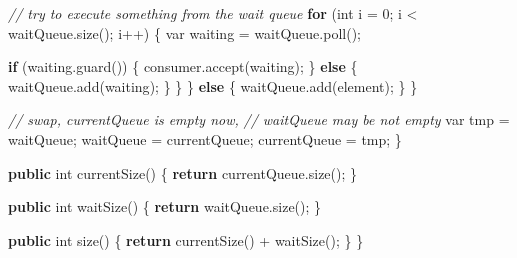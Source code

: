 \documentclass[11pt]{article}
\newenvironment{Shaded}{}{}
\newcommand{\KeywordTok}[1]{\textcolor[rgb]{0.00,0.44,0.13}{\textbf{{#1}}}}
\newcommand{\DataTypeTok}[1]{\textcolor[rgb]{0.56,0.13,0.00}{{#1}}}
\newcommand{\DecValTok}[1]{\textcolor[rgb]{0.25,0.63,0.44}{{#1}}}
\newcommand{\CommentTok}[1]{\textcolor[rgb]{0.38,0.63,0.69}{\textit{{#1}}}}
\newcommand{\FunctionTok}[1]{\textcolor[rgb]{0.02,0.16,0.49}{{#1}}}
\newcommand{\NormalTok}[1]{{#1}}
\newcommand{\ControlFlowTok}[1]{\textcolor[rgb]{0.00,0.44,0.13}{\textbf{{#1}}}}
\newcommand{\OperatorTok}[1]{\textcolor[rgb]{0.40,0.40,0.40}{{#1}}}
\begin{document}
\begin{Shaded}
\begin{Highlighting}[]
                \CommentTok{// try to execute something from the wait queue}
                \ControlFlowTok{for} \OperatorTok{(}\DataTypeTok{int}\NormalTok{ i }\OperatorTok{=} \DecValTok{0}\OperatorTok{;}\NormalTok{ i }\OperatorTok{\textless{}}\NormalTok{ waitQueue}\OperatorTok{.}\FunctionTok{size}\OperatorTok{();}\NormalTok{ i}\OperatorTok{++)} \OperatorTok{\{}
                    \DataTypeTok{var}\NormalTok{ waiting }\OperatorTok{=}\NormalTok{ waitQueue}\OperatorTok{.}\FunctionTok{poll}\OperatorTok{();}

                    \ControlFlowTok{if} \OperatorTok{(}\NormalTok{waiting}\OperatorTok{.}\FunctionTok{guard}\OperatorTok{())} \OperatorTok{\{}
\NormalTok{                        consumer}\OperatorTok{.}\FunctionTok{accept}\OperatorTok{(}\NormalTok{waiting}\OperatorTok{);}
                    \OperatorTok{\}} \ControlFlowTok{else} \OperatorTok{\{}
\NormalTok{                        waitQueue}\OperatorTok{.}\FunctionTok{add}\OperatorTok{(}\NormalTok{waiting}\OperatorTok{);}
                    \OperatorTok{\}}
                \OperatorTok{\}}
            \OperatorTok{\}} \ControlFlowTok{else} \OperatorTok{\{}
\NormalTok{                waitQueue}\OperatorTok{.}\FunctionTok{add}\OperatorTok{(}\NormalTok{element}\OperatorTok{);}
            \OperatorTok{\}}
        \OperatorTok{\}}

        \CommentTok{// swap, currentQueue is empty now,}
        \CommentTok{// waitQueue may be not empty}
        \DataTypeTok{var}\NormalTok{ tmp }\OperatorTok{=}\NormalTok{ waitQueue}\OperatorTok{;}
\NormalTok{        waitQueue }\OperatorTok{=}\NormalTok{ currentQueue}\OperatorTok{;}
\NormalTok{        currentQueue }\OperatorTok{=}\NormalTok{ tmp}\OperatorTok{;}
    \OperatorTok{\}}

    \KeywordTok{public} \DataTypeTok{int} \FunctionTok{currentSize}\OperatorTok{()} \OperatorTok{\{}
        \ControlFlowTok{return}\NormalTok{ currentQueue}\OperatorTok{.}\FunctionTok{size}\OperatorTok{();}
    \OperatorTok{\}}

    \KeywordTok{public} \DataTypeTok{int} \FunctionTok{waitSize}\OperatorTok{()} \OperatorTok{\{}
        \ControlFlowTok{return}\NormalTok{ waitQueue}\OperatorTok{.}\FunctionTok{size}\OperatorTok{();}
    \OperatorTok{\}}

    \KeywordTok{public} \DataTypeTok{int} \FunctionTok{size}\OperatorTok{()} \OperatorTok{\{}
        \ControlFlowTok{return} \FunctionTok{currentSize}\OperatorTok{()} \OperatorTok{+} \FunctionTok{waitSize}\OperatorTok{();}
    \OperatorTok{\}}
\OperatorTok{\}}
\end{Highlighting}
\end{Shaded}
\end{document}
